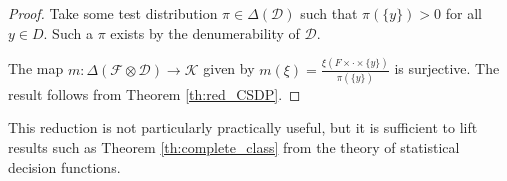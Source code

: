 \begin{proof}
Take some test distribution $\pi\in \Delta(\mathcal{D})$ such that $\pi(\{y\})>0$ for all $y\in D$. Such a $\pi$ exists by the denumerability of $\mathcal{D}$.

The map $m:\Delta(\mathcal{F}\otimes\mathcal{D})\to \mathscr{K}$ given by $m(\xi) = \frac{\xi(F\times \cdot\times \{y\})}{\pi(\{y\})}$ is surjective. The result follows from Theorem \ref{th:red_CSDP}.
\end{proof}

This reduction is not particularly practically useful, but it is sufficient to lift results such as Theorem \ref{th:complete_class} from the theory of statistical decision functions.
